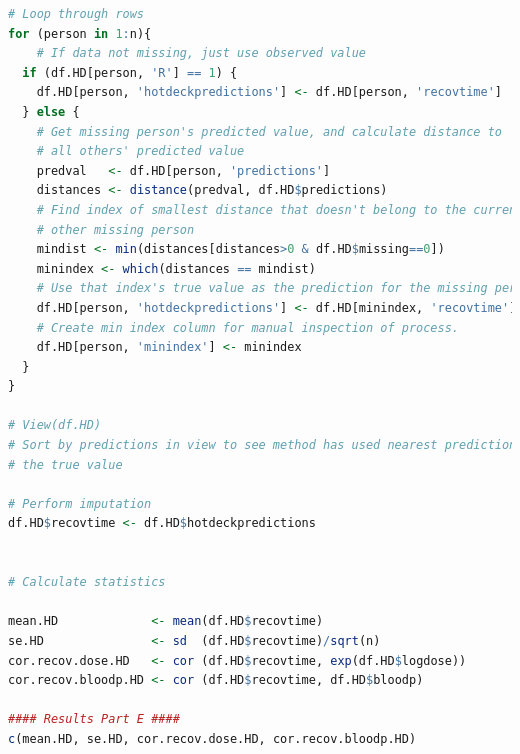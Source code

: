 \documentclass{article}
\numberwithin{equation}{section} %
\begin{document}
\begin{lstlisting}[language=R]
# Loop through rows
for (person in 1:n){
    # If data not missing, just use observed value
  if (df.HD[person, 'R'] == 1) {
    df.HD[person, 'hotdeckpredictions'] <- df.HD[person, 'recovtime']
  } else {
    # Get missing person's predicted value, and calculate distance to
    # all others' predicted value
    predval   <- df.HD[person, 'predictions']
    distances <- distance(predval, df.HD$predictions)
    # Find index of smallest distance that doesn't belong to the current or any 
    # other missing person
    mindist <- min(distances[distances>0 & df.HD$missing==0])
    minindex <- which(distances == mindist)
    # Use that index's true value as the prediction for the missing person
    df.HD[person, 'hotdeckpredictions'] <- df.HD[minindex, 'recovtime']
    # Create min index column for manual inspection of process. 
    df.HD[person, 'minindex'] <- minindex
  }
}

# View(df.HD)
# Sort by predictions in view to see method has used nearest prediction for
# the true value

# Perform imputation
df.HD$recovtime <- df.HD$hotdeckpredictions


# Calculate statistics

mean.HD             <- mean(df.HD$recovtime)
se.HD               <- sd  (df.HD$recovtime)/sqrt(n)
cor.recov.dose.HD   <- cor (df.HD$recovtime, exp(df.HD$logdose))
cor.recov.bloodp.HD <- cor (df.HD$recovtime, df.HD$bloodp)

#### Results Part E ####
c(mean.HD, se.HD, cor.recov.dose.HD, cor.recov.bloodp.HD)


\end{lstlisting}
\end{document}
